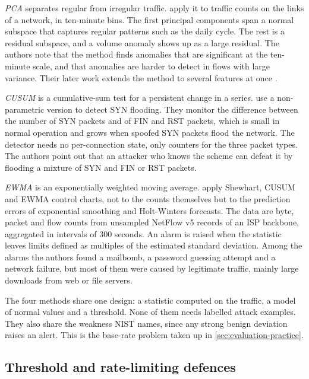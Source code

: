 \emph{PCA} separates regular from irregular traffic. \citet{lakhina2004diagnosing}
apply it to traffic counts on the links of a network, in ten-minute bins. The
first principal components span a normal subspace that captures regular
patterns such as the daily cycle. The rest is a residual subspace, and a
volume anomaly shows up as a large residual. The authors note that the method
finds anomalies that are significant at the ten-minute scale, and that
anomalies are harder to detect in flows with large variance. Their later
work extends the method to several features at once \citep{lakhina2005mining}.

\emph{CUSUM} is a cumulative-sum test for a persistent change in a series.
\citet{wang2002detecting} use a non-parametric version to detect SYN
flooding. They monitor the difference between the number of SYN packets and
of FIN and RST packets, which is small in normal operation and grows when
spoofed SYN packets flood the network. The detector needs no per-connection
state, only counters for the three packet types. The authors point out that
an attacker who knows the scheme can defeat it by flooding a mixture of SYN
and FIN or RST packets.

\emph{EWMA} is an exponentially weighted moving average. \citet{muenz2008control}
apply Shewhart, CUSUM and EWMA control charts, not to the counts themselves
but to the prediction errors of exponential smoothing and Holt-Winters
forecasts. The data are byte, packet and flow counts from unsampled NetFlow
v5 records of an ISP backbone, aggregated in intervals of 300 seconds. An
alarm is raised when the statistic leaves limits defined as multiples of the
estimated standard deviation. Among the alarms the authors found a mailbomb,
a password guessing attempt and a network failure, but most of them were
caused by legitimate traffic, mainly large downloads from web or file
servers.

The four methods share one design: a statistic computed on the traffic, a
model of normal values and a threshold. None of them needs labelled attack
examples. They also share the weakness NIST names, since any strong benign
deviation raises an alert. This is the base-rate problem taken up in
\cref{sec:evaluation-practice}.

\subsection{Threshold and rate-limiting defences}
\label{sec:threshold-rate-limiting}

